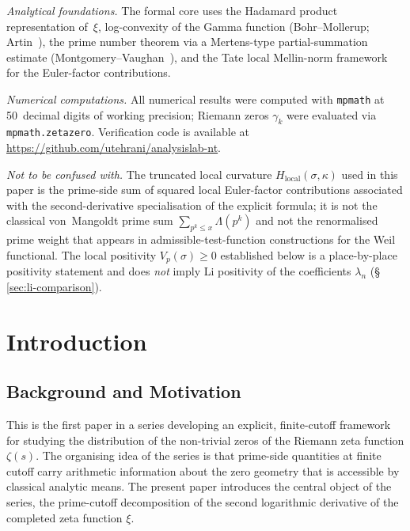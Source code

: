 \documentclass[11pt]{article}
\newcommand{\Hlocal}{H_{\mathrm{local}}}
\begin{document}
\medskip
\emph{Analytical foundations.}
The formal core uses the Hadamard product representation
of~$\xi$, log-convexity of the Gamma function
(Bohr--Mollerup; Artin~\cite{Artin}), the prime number
theorem via a Mertens-type partial-summation estimate
(Montgomery--Vaughan~\cite{MontgomeryVaughan}), and the
Tate local Mellin-norm framework~\cite{Tate1967} for the
Euler-factor contributions.

\medskip
\emph{Numerical computations.}
All numerical results were computed with \texttt{mpmath}
at 50~decimal digits of working precision;
Riemann zeros $\gamma_k$ were evaluated via
\texttt{mpmath.zetazero}.
Verification code is available at
\url{https://github.com/utehrani/analysislab-nt}.

\medskip
\emph{Not to be confused with.}
The truncated local curvature $\Hlocal(\sigma,\kappa)$ used in
this paper is the prime-side sum of squared local Euler-factor
contributions associated with the second-derivative
specialisation of the explicit formula; it is not the
classical von~Mangoldt prime sum
$\sum_{p^k\le x}\Lambda(p^k)$ and not the renormalised prime
weight that appears in admissible-test-function constructions
for the Weil functional.
The local positivity $V_p(\sigma)\ge 0$ established below is
a place-by-place positivity statement and does \emph{not}
imply Li positivity of the coefficients $\lambda_n$
(\S\,\ref{sec:li-comparison}).

\newpage

\section{Introduction}
\label{sec:intro}

\subsection{Background and Motivation}
\label{sec:bg}

This is the first paper in a series developing an explicit,
finite-cutoff framework for studying the distribution of the
non-trivial zeros of the Riemann zeta function $\zeta(s)$.
The organising idea of the series is that prime-side
quantities at finite cutoff carry arithmetic information
about the zero geometry that is accessible by classical
analytic means.
The present paper introduces the central object of the
series, the prime-cutoff decomposition of the second
logarithmic derivative of the completed zeta function $\xi$.
\end{document}

